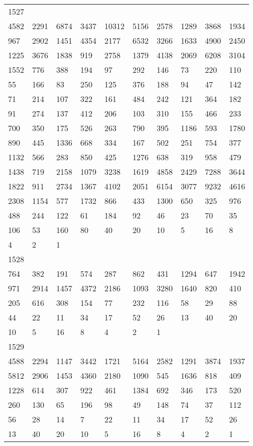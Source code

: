 \begin{longtable}{*{10}{l}}
1527&&&&&&&&&\\
4582& 2291& 6874& 3437& 10312& 5156& 2578& 1289& 3868& 1934\\
967& 2902& 1451& 4354& 2177& 6532& 3266& 1633& 4900& 2450\\
1225& 3676& 1838& 919& 2758& 1379& 4138& 2069& 6208& 3104\\
1552& 776& 388& 194& 97& 292& 146& 73& 220& 110\\
55& 166& 83& 250& 125& 376& 188& 94& 47& 142\\
71& 214& 107& 322& 161& 484& 242& 121& 364& 182\\
91& 274& 137& 412& 206& 103& 310& 155& 466& 233\\
700& 350& 175& 526& 263& 790& 395& 1186& 593& 1780\\
890& 445& 1336& 668& 334& 167& 502& 251& 754& 377\\
1132& 566& 283& 850& 425& 1276& 638& 319& 958& 479\\
1438& 719& 2158& 1079& 3238& 1619& 4858& 2429& 7288& 3644\\
1822& 911& 2734& 1367& 4102& 2051& 6154& 3077& 9232& 4616\\
2308& 1154& 577& 1732& 866& 433& 1300& 650& 325& 976\\
488& 244& 122& 61& 184& 92& 46& 23& 70& 35\\
106& 53& 160& 80& 40& 20& 10& 5& 16& 8\\
4& 2& 1& \\

1528&&&&&&&&&\\
764& 382& 191& 574& 287& 862& 431& 1294& 647& 1942\\
971& 2914& 1457& 4372& 2186& 1093& 3280& 1640& 820& 410\\
205& 616& 308& 154& 77& 232& 116& 58& 29& 88\\
44& 22& 11& 34& 17& 52& 26& 13& 40& 20\\
10& 5& 16& 8& 4& 2& 1& \\

1529&&&&&&&&&\\
4588& 2294& 1147& 3442& 1721& 5164& 2582& 1291& 3874& 1937\\
5812& 2906& 1453& 4360& 2180& 1090& 545& 1636& 818& 409\\
1228& 614& 307& 922& 461& 1384& 692& 346& 173& 520\\
260& 130& 65& 196& 98& 49& 148& 74& 37& 112\\
56& 28& 14& 7& 22& 11& 34& 17& 52& 26\\
13& 40& 20& 10& 5& 16& 8& 4& 2& 1\\


\end{longtable}
